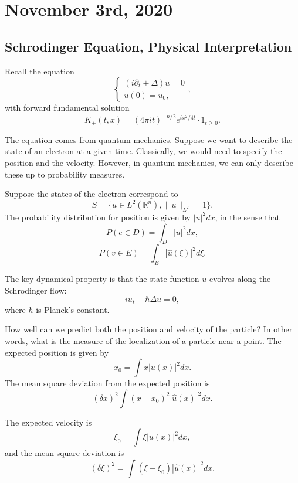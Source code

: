 \documentclass[11pt]{scrartcl}
\newcommand{\R}{\mathbb{R}}
\renewcommand{\hat}{\widehat}
\begin{document}
\section{November 3rd, 2020}
\subsection{Schrodinger Equation, Physical Interpretation}
Recall the equation
$$\begin{cases}
(i \partial_t + \Delta) u = 0 \\
u(0) = u_0,
\end{cases},$$
with forward fundamental solution 
$$K_+(t, x) = (4 \pi i t)^{-n/2} e^{ix^2/4t} \cdot 1_{t \ge 0}.$$

The equation comes from quantum mechanics.  Suppose we want to describe the state of an electron at a given time.  Classically, we would need to specify the position and the velocity.  However, in quantum mechanics, we can only describe these up to probability measures.

Suppose the states of the electron correspond to $$S = \{u \in L^2(\R^n), \|u\|_{L^2} = 1\}.$$
The probability distribution for position is given by $|u|^2dx$, in the sense that 
$$P(e \in D) = \int_D |u|^2 dx,$$
$$P(v \in E) = \int_E |\hat{u}(\xi)|^2d\xi.$$

The key dynamical property is that the state function $u$ evolves along the Schrodinger flow:
$$iu_t + \hbar \Delta u = 0,$$
where $\hbar$ is Planck's constant.

How well can we predict both the position and velocity of the particle?  In other words, what is the measure of the localization of a particle near a point.  The expected position is given by 
$$x_0 = \int x |u(x)|^2 dx.$$
The mean square deviation from the expected position is 
$$(\delta x)^2\int (x - x_0)^2 |\hat{u}(x)|^2 dx.$$

The expected velocity is 
$$\xi_0 = \int \xi |u(x)|^2 dx,$$
and the mean square deviation is 
$$(\delta \xi)^2 = \int (\xi - \xi_0) |\hat{u}(x)|^2 dx.$$
\end{document}
